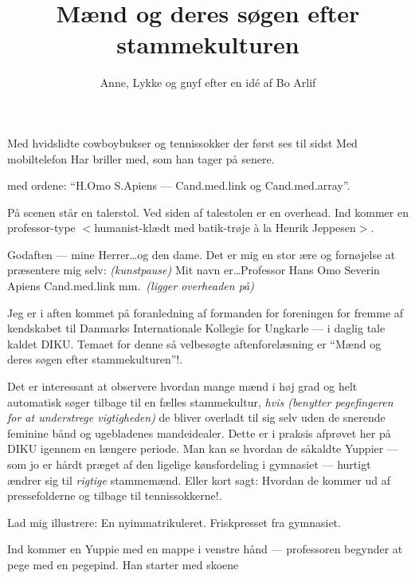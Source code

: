 \documentclass{article}
\title{Mænd og deres søgen efter stammekulturen}
\author{Anne, Lykke og gnyf efter en idé af Bo Arlif}
\begin{document}
\maketitle

\begin{roles}
 Med hvidslidte cowboybukser og tennissokker der først ses til sidst
 Med mobiltelefon
 Har briller med, som han tager på senere.
\end{roles}

\begin{props}
\strut
{} med ordene: ``H.Omo
  S.Apiens --- Cand.med.link og Cand.med.array''.
\end{props}

\begin{sketch}
\scene
På scenen står en talerstol. Ved siden af talestolen er en overhead.
Ind kommer en professor-type $<$humanist-klædt med batik-trøje \`a la Henrik
Jeppesen$>$.

 Godaften --- mine Herrer\dots og den dame. Det er mig en
stor ære og fornøjelse at præsentere mig selv: {\em (kunstpause)} Mit navn
er\dots Professor Hans Omo Severin Apiens Cand.med.link mm.\ {\em (ligger
  overheaden på)}

Jeg er i aften kommet på foranledning af formanden for foreningen for
fremme af kendskabet til Danmarks Internationale Kollegie for Ungkarle ---
i daglig tale kaldet DIKU. Temaet for denne så velbesøgte aftenforelæsning
er ``Mænd og deres søgen efter stammekulturen''!.

Det er interessant at observere hvordan mange mænd i høj grad og helt
automatisk søger tilbage til en fælles stammekultur, {\em hvis (benytter
  pegefingeren for at understrege vigtigheden)} de bliver overladt til sig
selv uden de snerende feminine bånd og ugebladenes mandeidealer. Dette er i
praksis afprøvet her på DIKU igennem en længere periode. Man kan se hvordan
de såkaldte Yuppier --- som jo er hårdt præget af den ligelige
kønsfordeling i gymnasiet --- hurtigt ændrer sig til {\em rigtige}
stammemænd. Eller kort sagt: Hvordan de kommer ud af pressefolderne og
tilbage til tennissokkerne!.

Lad mig illustrere: En nyimmatrikuleret. Friskpresset fra gymnasiet.

\scene Ind kommer en Yuppie med en mappe i venstre hånd ---
professoren begynder at pege med en pegepind. Han starter med skoene



\end{sketch}
\end{document}
